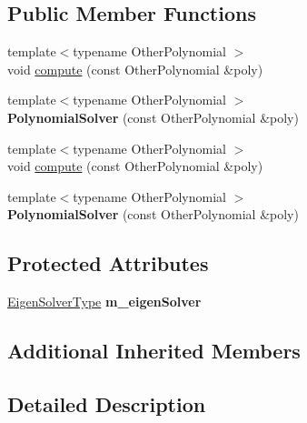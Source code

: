\subsection*{Public Member Functions}
\begin{DoxyCompactItemize}
\item 
{\footnotesize template$<$typename Other\+Polynomial $>$ }\\void \hyperlink{class_eigen_1_1_polynomial_solver_ac3ceae48528f3798d44c15a025cb03b8}{compute} (const Other\+Polynomial \&poly)
\item 
\mbox{\label{class_eigen_1_1_polynomial_solver_a2d2847948772246f7d90cc2f22d80b46}} 
{\footnotesize template$<$typename Other\+Polynomial $>$ }\\{\bfseries Polynomial\+Solver} (const Other\+Polynomial \&poly)
\item 
{\footnotesize template$<$typename Other\+Polynomial $>$ }\\void \hyperlink{class_eigen_1_1_polynomial_solver_ac3ceae48528f3798d44c15a025cb03b8}{compute} (const Other\+Polynomial \&poly)
\item 
\mbox{\label{class_eigen_1_1_polynomial_solver_a2d2847948772246f7d90cc2f22d80b46}} 
{\footnotesize template$<$typename Other\+Polynomial $>$ }\\{\bfseries Polynomial\+Solver} (const Other\+Polynomial \&poly)
\end{DoxyCompactItemize}
\subsection*{Protected Attributes}
\begin{DoxyCompactItemize}
\item 
\mbox{\label{class_eigen_1_1_polynomial_solver_ab244e954db8a5a777c799cd7a1ad6631}} 
\hyperlink{group___eigenvalues___module}{Eigen\+Solver\+Type} {\bfseries m\+\_\+eigen\+Solver}
\end{DoxyCompactItemize}
\subsection*{Additional Inherited Members}


\subsection{Detailed Description}

